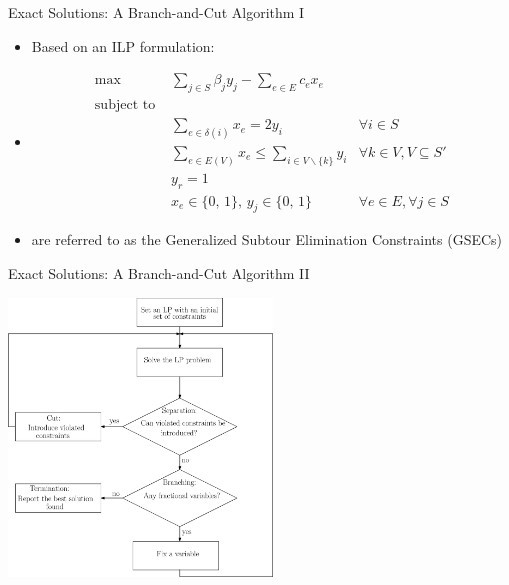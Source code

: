 \documentclass[10pt]{beamer}
\begin{document}
\begin{frame}{Exact Solutions: A Branch-and-Cut Algorithm I}
\begin{itemize}
    \item<1-> Based on an ILP formulation:
    \item<2-> [ ] \begin{align} 
    \text {max } \label{pctsp_obj}     & \sum_{j\in S} \beta_j y_j  - \sum_{e\in E} c_e x_e &
    \\
    \text{subject to } \nonumber    &  & \\
    \label{const:pctsp1}               & \sum_{e \in \delta(i)} x_e = 2 y_{i}  & \forall i \in S \\
    \label{const:pctsp2}               & \sum_{e \in E(V) } x_e \leq \sum_{i \in V \backslash\{ k \}} y_{i} & \forall k \in V, V\subseteq S' \\
    \label{const:pctsp3}               & y_r = 1 \\
    \label{const:pctsp4}               & x_e \in \{0, \, 1\}, \, y_j \in \{0, \, 1\}  & \forall e \in E, \forall j \in S 
    \end{align}
    \item<3->  are referred to as the \alert{Generalized Subtour Elimination Constraints} (GSECs) 
\end{itemize}
\end{frame}

\begin{frame}{Exact Solutions: A Branch-and-Cut Algorithm II}
\begin{center}
        \includegraphics[width=7cm]{Branch_and_Cut.eps} 
\end{center}
\end{frame}
\end{document}
